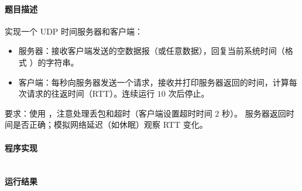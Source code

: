 \documentclass{academics}
\begin{document}
\paragraph{题目描述} {
    实现一个 UDP 时间服务器和客户端：
    \begin{itemize}
        \item 服务器：接收客户端发送的空数据报（或任意数据），回复当前系统时间（格式 ）的字符串。
        \item 客户端：每秒向服务器发送一个请求，接收并打印服务器返回的时间，计算每次请求的往返时间（RTT）。连续运行 $10$ 次后停止。
    \end{itemize}
    要求：使用 ，注意处理丢包和超时（客户端设置超时时间 $2$ 秒）。
    服务器返回时间是否正确；模拟网络延迟（如休眠）观察 RTT 变化。
}

\paragraph{程序实现} {
    \inputminted[label=UdpTimeServer.java]{java}{../src/P08/UdpTimeServer.java}
}

\paragraph{运行结果} {
    \inputminted{text}{../res/P08.out}
}
\end{document}
